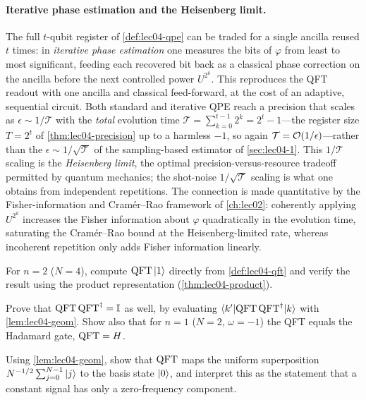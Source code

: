 \paragraph{Iterative phase estimation and the Heisenberg limit.}
The full $t$-qubit register of \cref{def:lec04-qpe} can be traded for a single
ancilla reused $t$ times: in \emph{iterative phase estimation} one measures the
bits of $\varphi$ from least to most significant, feeding each recovered bit back
as a classical phase correction on the ancilla before the next controlled power
$U^{2^{k}}$. This reproduces the QFT readout with one ancilla and classical
feed-forward, at the cost of an adaptive, sequential circuit. Both standard and
iterative QPE reach a precision that scales as $\epsilon\sim1/\mathcal{T}$ with
the \emph{total} evolution time $\mathcal{T}=\sum_{k=0}^{t-1} 2^{k}=2^{t}-1$---the
register size $T=2^{t}$ of \cref{thm:lec04-precision} up to a harmless $-1$, so again
$\mathcal{T}=\mathcal{O}(1/\epsilon)$---rather than the $\epsilon\sim1/\sqrt{\mathcal{T}}$ of the sampling-based estimator
of \cref{sec:lec04-1}. This $1/\mathcal{T}$ scaling is the \emph{Heisenberg
limit}, the optimal precision-versus-resource tradeoff permitted by quantum
mechanics; the shot-noise $1/\sqrt{\mathcal{T}}$ scaling is what one obtains from
independent repetitions. The connection is made quantitative by the
Fisher-information and Cram\'er--Rao framework of \cref{ch:lec02}: coherently
applying $U^{2^{k}}$ increases the Fisher information about $\varphi$
quadratically in the evolution time, saturating the Cram\'er--Rao bound at the
Heisenberg-limited rate, whereas incoherent repetition only adds Fisher
information linearly.

\exercisesection
\begin{exercise}\label{ex:lec04-1}
For $n=2$ ($N=4$), compute $\mathrm{QFT}\ket{1}$ directly from \cref{def:lec04-qft} and
verify the result using the product representation
(\cref{thm:lec04-product}).
\end{exercise}

\begin{exercise}\label{ex:lec04-2}
Prove that $\mathrm{QFT}\,\mathrm{QFT}^{\dagger}=\mathbb{I}$ as well, by evaluating
$\braket{k'|\mathrm{QFT}\,\mathrm{QFT}^{\dagger}|k}$ with \cref{lem:lec04-geom}. Show also that for
$n=1$ ($N=2$, $\omega=-1$) the QFT equals the Hadamard gate, $\mathrm{QFT}=H$.
\end{exercise}

\begin{exercise}\label{ex:lec04-3}
Using \cref{lem:lec04-geom}, show that $\mathrm{QFT}$ maps the uniform superposition
$N^{-1/2}\sum_{j=0}^{N-1}\ket{j}$ to the basis state $\ket{0}$, and interpret this
as the statement that a constant signal has only a zero-frequency component.
\end{exercise}

